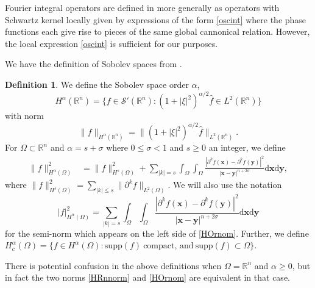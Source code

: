 \documentclass[a4paper,12pt]{amsart}
\numberwithin{equation}{section}
\theoremstyle{plain}
\numberwithin{theorem}{section}
\theoremstyle{definition}
\newtheorem{definition}[theorem]{Definition}
\theoremstyle{remark}
\theoremstyle{remark}
\theoremstyle{remark}
\newcommand{\vx}{{\mathbf{x}}}
\newcommand{\vy}{{\mathbf{y}}}
\newcommand{\seanc}[1]{\begin{quotation}\textbf{Sean's comment:\
}{\textit{#1}}\end{quotation}}
\begin{document}
Fourier integral operators are defined in \cite{hormander} more generally as operators with Schwartz kernel locally given by expressions of the form \eqref{oscint} where the phase functions each give rise to pieces of the same global cannonical relation. However, the local expression \eqref{oscint} is sufficient for our purposes.


We have the definition of Sobolev spaces from \cite[page 200]{natterer}.

\begin{definition}\label{sobo_spaces}
We define the Sobolev space order $\alpha$,
\begin{equation}
H^\alpha(\mathbb{R}^n) = \{f\in \mathcal{S}'(\mathbb{R}^n) : (1 + |\xi|^2)^{\alpha/2} \hat{f} \in L^2(\mathbb{R}^n)\}
\end{equation}
with norm 
\begin{equation}\label{HRnnorm}
\|f\|_{H^{\alpha}(\mathbb{R}^n)} = \|(1 + |\xi|^2)^{\alpha/2} \hat{f}\|_{L^2(\mathbb{R}^n)}.
\end{equation}
For $\Omega \subset \mathbb{R}^n$ and $\alpha = s + \sigma$ where $0\leq\sigma<1$ and $s \geq 0$ an integer, we define
\begin{equation} \label{HOrnom}
\begin{split}
\|f\|^2_{H^{\alpha}(\Omega)} &= \|f\|^2_{H^s(\Omega)} + \sum_{|k|= s}\int_{\Omega}\int_{\Omega} \frac{|\partial^kf(\vx) - \partial^kf(\vy)|^2}{|\vx - \vy|^{n+2\sigma}}\mathrm{d}\vx\mathrm{d}\vy,
\end{split}
\end{equation}
where $\|f\|^2_{H^s(\Omega)} = \sum_{|k|\leq s} \|\partial^kf\|_{L^2(\Omega)}$. We will also use the notation
\[
|f|^2_{H^{\alpha}(\Omega)} = \sum_{|k|= s}\int_{\Omega}\int_{\Omega} \frac{|\partial^kf(\vx) - \partial^kf(\vy)|^2}{|\vx - \vy|^{n+2\sigma}}\mathrm{d}\vx\mathrm{d}\vy
\]
for the semi-norm which appears on the left side of \eqref{HOrnom}. Further, we define $H^\alpha_c(\Omega) = \{f \in H^\alpha(\Omega) : \text{supp}(f)\ \text{compact, and}\ \text{supp}(f) \subset {\Omega}\}$.
\end{definition}

There is potential confusion in the above definitions when $\Omega = \mathbb{R}^n$ and $\alpha \geq 0$, but in fact the two norms \eqref{HRnnorm} and \eqref{HOrnom} are equivalent in that case.

\end{document}
